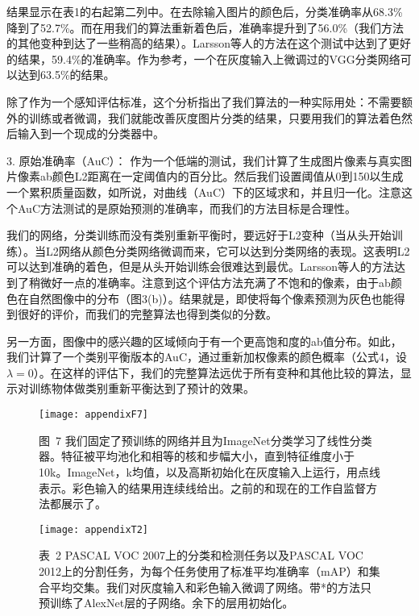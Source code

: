 结果显示在表1的右起第二列中。在去除输入图片的颜色后，分类准确率从68.3\%降到了52.7\%。而在用我们的算法重新着色后，准确率提升到了56.0\%（我们方法的其他变种到达了一些稍高的结果）。Larsson等人的方法在这个测试中达到了更好的结果，59.4\%的准确率。作为参考，一个在灰度输入上微调过的VGG分类网络可以达到63.5\%的结果。

除了作为一个感知评估标准，这个分析指出了我们算法的一种实际用处：不需要额外的训练或者微调，我们就能改善灰度图片分类的结果，只要用我们的算法着色然后输入到一个现成的分类器中。

3. {\heiti 原始准确率（AuC）： } 作为一个低端的测试，我们计算了生成图片像素与真实图片像素ab颜色L2距离在一定阈值内的百分比。然后我们设置阈值从0到150以生成一个累积质量函数，如所说，对曲线（AuC）下的区域求和，并且归一化。注意这个AuC方法测试的是原始预测的准确率，而我们的方法目标是合理性。

我们的网络，分类训练而没有类别重新平衡时，要远好于L2变种（当从头开始训练）。当L2网络从颜色分类网络微调而来，它可以达到分类网络的表现。这表明L2可以达到准确的着色，但是从头开始训练会很难达到最优。Larsson等人的方法达到了稍微好一点的准确率。注意到这个评估方法充满了不饱和的像素，由于ab颜色在自然图像中的分布（图3(b)）。结果就是，即使将每个像素预测为灰色也能得到很好的评价，而我们的完整算法也得到类似的分数。

另一方面，图像中的感兴趣的区域倾向于有一个更高饱和度的ab值分布。如此，我们计算了一个类别平衡版本的AuC，通过重新加权像素的颜色概率（公式4，设$\lambda = 0$）。在这样的评估下，我们的完整算法远优于所有变种和其他比较的算法，显示对训练物体做类别重新平衡达到了预计的效果。

\begin{figure}[h]
  \centering
  \texttt{[image: appendixF7]}
  \caption*{图~7 我们固定了预训练的网络并且为ImageNet分类学习了线性分类器。特征被平均池化和相等的核和步幅大小，直到特征维度小于10k。ImageNet，k均值，以及高斯初始化在灰度输入上运行，用点线表示。彩色输入的结果用连续线给出。之前的和现在的工作自监督方法都展示了。}
  \label{tab:badfigure8}
\end{figure}

\begin{figure}[h]
  \centering
  \texttt{[image: appendixT2]}
  \caption*{表~2 PASCAL VOC 2007上的分类和检测任务以及PASCAL VOC 2012上的分割任务，为每个任务使用了标准平均准确率（mAP）和集合平均交集。我们对灰度输入和彩色输入微调了网络。带*的方法只预训练了AlexNet层的子网络。余下的层用初始化。}
  \label{tab:badfigure9}
\end{figure}


